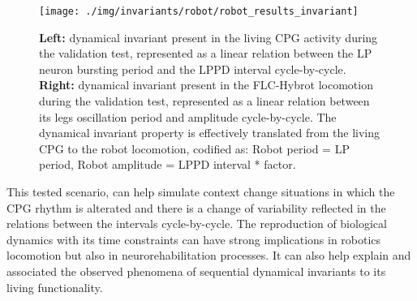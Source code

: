 \begin{figure}[hbt!]
	\begin{center}
		\texttt{[image: ./img/invariants/robot/robot\_results\_invariant]}
	\end{center}
	\caption{\textbf{Left:} dynamical invariant present in the living CPG activity during the validation test, represented as a linear relation between the LP neuron bursting period and the LPPD interval cycle-by-cycle. \textbf{Right:} dynamical invariant present in the FLC-Hybrot locomotion during the validation test, represented as a linear relation between its legs oscillation period and amplitude cycle-by-cycle. The dynamical invariant property is effectively translated from the living CPG to the robot locomotion, codified as: Robot period = LP period, Robot amplitude = LPPD interval * factor.}
	\label{fig:robot_results_invariant}
\end{figure}

This tested scenario, can help simulate context change situations in which the CPG rhythm is alterated and there is a change of variability reflected in the relations between the intervals cycle-by-cycle. The reproduction of biological dynamics with its time constraints can have strong implications in robotics locomotion but also in neurorehabilitation processes. It can also help explain and associated the observed phenomena of sequential dynamical invariants to its living functionality.
